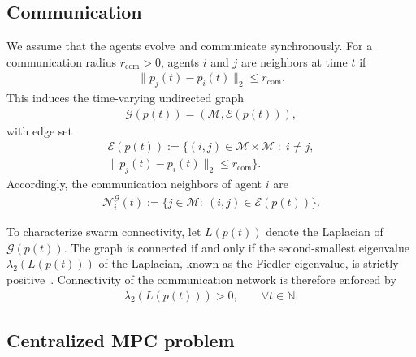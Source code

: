\documentclass[letterpaper, 10 pt, conference]{ieeeconf}  %
\newcommand{\N}{\mathbb{N}}
\begin{document}
\subsection{Communication}

We assume that the agents evolve and communicate synchronously. For a communication
radius $r_{\mathrm{com}}>0$, agents $i$ and $j$ are neighbors at time $t$ if
\begin{align}
	\|p_j(t)-p_i(t)\|_2 \leq r_{\mathrm{com}}.
\end{align}
This induces the time-varying undirected graph
\begin{align}
	\mathcal{G}(p(t))
	=
	\left(\mathcal{M},\mathcal{E}(p(t))\right),
\end{align}
with edge set
\begin{multline}
	\mathcal{E}(p(t))
	:=
	\{
	(i,j)\in\mathcal{M}\times\mathcal{M}\;:\;
	i\neq j, \\ \|p_j(t)-p_i(t)\|_2 \leq r_{\mathrm{com}}
	\}.
\end{multline}
Accordingly, the communication neighbors of agent $i$ are
\begin{align}
	\mathcal{N}^{\mathcal{G}}_i(t)
	:=
	\{j\in\mathcal{M}:\ (i,j)\in\mathcal{E}(p(t))\}.
\end{align}

To characterize swarm connectivity, let $L(p(t))$ denote the Laplacian of $\mathcal{G}(p(t))$. The graph is connected if and only if the second-smallest eigenvalue $\lambda_2(L(p(t)))$ of the Laplacian,  known as the Fiedler eigenvalue, is strictly positive~\cite{fiedler1973algebraic,bullo2018lectures,mohar1991laplacian}. Connectivity of the communication network is therefore enforced by
\begin{align}
	\lambda_2\!\left(L(p(t))\right) > 0,
	\qquad \forall t\in\N. \label{eq:connectivity_constraint}
\end{align}


\subsection{Centralized MPC problem}
\end{document}
